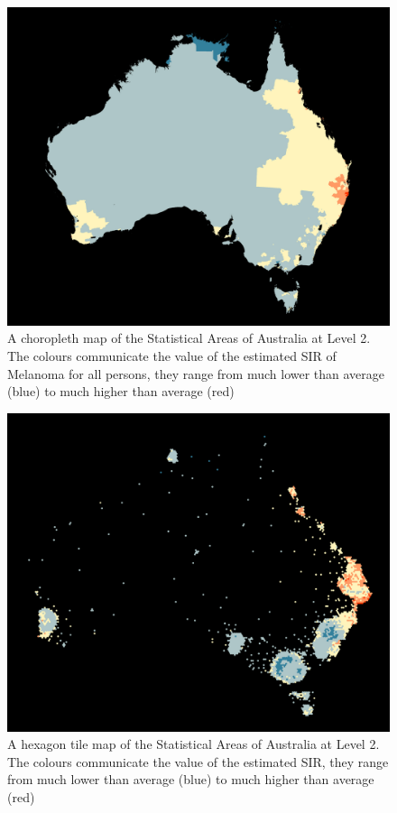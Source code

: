 \documentclass{monashthesis}
\begin{document}
\begin{figure}[H]
\centering
\includegraphics[width=14cm]{figures/03-algorithm/aus_melanoma_p.pdf}
\caption{\label{fig:melanoma-geo}A choropleth map of the Statistical Areas of Australia at Level 2. The colours communicate the value of the estimated SIR of Melanoma for all persons, they range from much lower than average (blue) to much higher than average (red)}
\end{figure}

\begin{figure}[H]
\centering
\includegraphics[width=14cm]{figures/03-algorithm/aus_melanoma_p_hex.pdf}
\caption{\label{fig:melanoma-hex}A hexagon tile map of the Statistical Areas of Australia at Level 2. The colours communicate the value of the estimated SIR, they range from much lower than average (blue) to much higher than average (red)}
\end{figure}
\end{document}
